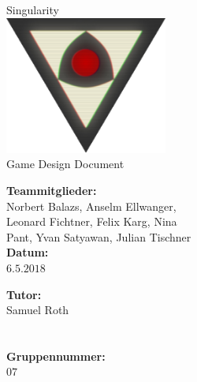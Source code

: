 \documentclass[12pt]{article}
\newcommand{\changefont}[4]{{\fontfamily{#1}\fontsize{#2}{#3}\selectfont #4}} %
\begin{document}
\renewcommand{\figurename}{Fig.}%
\renewcommand{\arraystretch}{1.4}%

\begin{titlepage}
    \begin{center}
        \changefont{pbk}{32}{35}{Singularity}\\\vspace{3em}
        \includegraphics[width=0.4\textwidth]{res/SingularityLogo2.png}\\\vspace{5em}
        \changefont{cmr}{32}{35}{Game Design Document}
    \end{center}
    \vspace{7em}

    \begin{minipage}[t]{.5\textwidth}
        \begin{center}
            \textbf{Teammitglieder:}\\
            \vspace{.5em}
            Norbert Balazs, Anselm Ellwanger,\\
            Leonard Fichtner, Felix Karg, Nina\\
            Pant, Yvan Satyawan, Julian Tischner\\
            \vspace{2em}
            \textbf{Datum:}\\
            \vspace{.5em}
            $6.5.2018$
        \end{center}
    \end{minipage}
    \begin{minipage}[t]{.5\textwidth}
        \begin{center}
            \textbf{Tutor:}\\
            \vspace{.5em}
            Samuel Roth\\
            \quad\\
            \quad\\
            \vspace{2em}
            \textbf{Gruppennummer:}\\
            \vspace{.5em}
            $07$
        \end{center}
    \end{minipage}
\end{titlepage}
\end{document}

